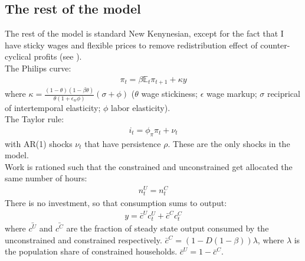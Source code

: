 \documentclass[AER]{AEA}
\begin{document}
\subsection{The rest of the model}
The rest of the model is standard New Kenynesian, except for the fact that I have sticky wages and flexible prices to remove redistribution effect of counter-cyclical profits (see \cite{arGHH}).\\
The Philips curve:
\begin{align*}
\pi_t = \beta \mathbb{E}_t \pi_{t+1} + \kappa y
\end{align*}
where $\kappa = \frac{(1-\theta)(1-\beta \theta)}{\theta(1+\epsilon_w \phi)} (\sigma+\phi)$ ($\theta$ wage stickiness; $\epsilon$ wage markup; $\sigma$ reciprical of intertemporal elasticity; $\phi$ labor elasticity).\\
The Taylor rule:
\begin{align*}
i_t = \phi_{\pi} \pi_t + \nu_t
\end{align*}
with AR(1) shocks $\nu_t$ that have persistence $\rho$. These are the only shocks in the model.\\
Work is rationed such that the constrained and unconstrained get allocated the same number of hours:
\begin{align*}
n^U_t = n^C_t  
\end{align*}
There is no investment, so that consumption sums to output:
\begin{align*}
y = \bar{c}^U c^U_t +  \bar{c}^C c^C_t
\end{align*}
where $ \bar{c^U}$ and $ \bar{c^C}$ are the fraction of steady state output consumed by the unconstrained and constrained respectively. $ \bar{c}^C = (1-D(1-\beta)) \lambda$, where $\lambda$ is the population share of constrained households. $\bar{c}^U = 1-\bar{c}^C$.
\end{document}
